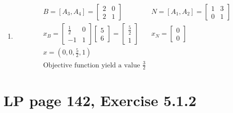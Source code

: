 \documentclass[11pt]{article}
\begin{document}
\begin{enumerate}
    \item \begin{align*}
        & B = [A_3, A_4]=\begin{bmatrix} 2 & 0 \\ 2 & 1\end{bmatrix}& N = [A_1, A_2]=\begin{bmatrix} 1 & 3 \\ 0 & 1\end{bmatrix} \\
        & x_B = \begin{bmatrix} \frac{1}{2} & 0 \\ -1 & 1 \end{bmatrix} \begin{bmatrix} 5 \\ 6 \end{bmatrix} = \begin{bmatrix} \frac{5}{2} \\ 1 \end{bmatrix} & x_N = \begin{bmatrix} 0 \\ 0\end{bmatrix} \\
        & x = (0, 0, \frac{5}{2}, 1) &\\
        &\text{Objective function yield a value $\frac{3}{2}$} &
    \end{align*}
\end{enumerate}

\section{LP page 142, Exercise 5.1.2}
\end{document}
